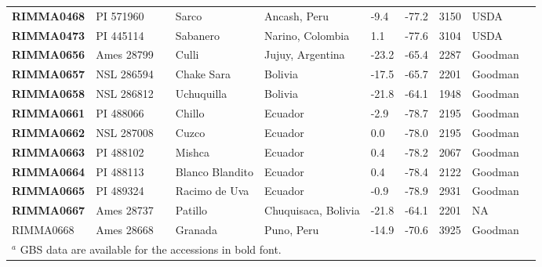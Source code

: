 \begin{table}[h]
\begin{center}
{\begin{tabular}{llllllllll}
{\bf RIMMA0468}	&	PI 571960	&		&	Sarco	&	Ancash, Peru	&	-9.4 	&	-77.2 	&	3150	&	USDA	\\
{\bf RIMMA0473}	&	PI 445114	&		&	Sabanero	&	Narino, Colombia	&	1.1 	&	-77.6 	&	3104	&	USDA	\\
{\bf RIMMA0656}	&	Ames 28799	&		&	Culli	&	Jujuy, Argentina	&	-23.2 	&	-65.4 	&	2287	&	Goodman	\\
{\bf RIMMA0657}	&	NSL 286594	&		&	Chake Sara	&	Bolivia	&	-17.5 	&	-65.7 	&	2201	&	Goodman	\\
{\bf RIMMA0658}	&	NSL 286812	&		&	Uchuquilla	&	Bolivia	&	-21.8 	&	-64.1 	&	1948	&	Goodman	\\
{\bf RIMMA0661}	&	PI 488066	&		&	Chillo	&	Ecuador	&	-2.9 	&	-78.7 	&	2195	&	Goodman	\\
{\bf RIMMA0662}	&	NSL 287008	&		&	Cuzco	&	Ecuador	&	0.0 	&	-78.0 	&	2195	&	Goodman	\\
{\bf RIMMA0663}	&	PI 488102	&		&	Mishca	&	Ecuador	&	0.4 	&	-78.2 	&	2067	&	Goodman	\\
{\bf RIMMA0664}	&	PI 488113	&		&	Blanco Blandito	&	Ecuador	&	0.4 	&	-78.4 	&	2122	&	Goodman	\\
{\bf RIMMA0665}	&	PI 489324	&		&	Racimo de Uva	&	Ecuador	&	-0.9 	&	-78.9 	&	2931	&	Goodman	\\
{\bf RIMMA0667}	&	Ames 28737	&		&	Patillo	&	Chuquisaca, Bolivia	&	-21.8 	&	-64.1 	&	2201	&	NA	\\
RIMMA0668	&	Ames 28668	&		&	Granada	&	Puno, Peru	&	-14.9 	&	-70.6 	&	3925	&	Goodman	\\[-0.1mm] 
	\hline\hline
	\multicolumn{9}{l}{$^a$ GBS data are available for the accessions in bold font.}\\
    \end{tabular}}
    \label{srkid}

\end{center} 

\end{table}

\clearpage




